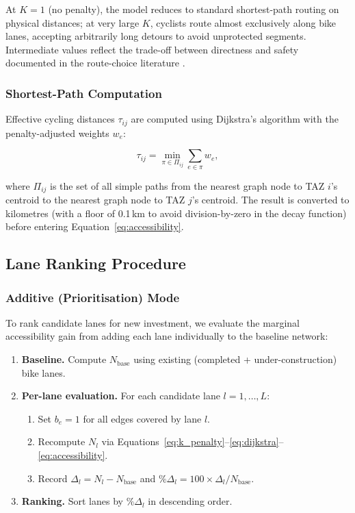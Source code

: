 \documentclass[12pt,a4paper]{article}
\begin{document}


At $K = 1$ (no penalty), the model reduces to standard shortest-path routing on physical distances; at very large $K$, cyclists route almost exclusively along bike lanes, accepting arbitrarily long detours to avoid unprotected segments. Intermediate values reflect the trade-off between directness and safety documented in the route-choice literature \citep{broach2012bicycle,winters2010far}.

\subsubsection{Shortest-Path Computation}

Effective cycling distances $\tau_{ij}$ are computed using Dijkstra's algorithm with the penalty-adjusted weights $w_e$:

\begin{equation}
\tau_{ij} = \min_{\pi \in \Pi_{ij}} \sum_{e \in \pi} w_e,
\label{eq:dijkstra}
\end{equation}

\noindent where $\Pi_{ij}$ is the set of all simple paths from the nearest graph node to TAZ $i$'s centroid to the nearest graph node to TAZ $j$'s centroid. The result is converted to kilometres (with a floor of 0.1\,km to avoid division-by-zero in the decay function) before entering Equation~\eqref{eq:accessibility}.

\subsection{Lane Ranking Procedure}
\label{sec:ranking}

\subsubsection{Additive (Prioritisation) Mode}

To rank candidate lanes for new investment, we evaluate the marginal accessibility gain from adding each lane individually to the baseline network:

\begin{enumerate}[leftmargin=*,nosep]
    \item \textbf{Baseline.} Compute $N_{\mathrm{base}}$ using existing (completed + under-construction) bike lanes.
    \item \textbf{Per-lane evaluation.} For each candidate lane $l = 1, \ldots, L$:
    \begin{enumerate}[nosep]
        \item Set $b_e = 1$ for all edges covered by lane $l$.
        \item Recompute $N_l$ via Equations~\eqref{eq:k_penalty}--\eqref{eq:dijkstra}--\eqref{eq:accessibility}.
        \item Record $\Delta_l = N_l - N_{\mathrm{base}}$ and $\%\Delta_l = 100 \times \Delta_l / N_{\mathrm{base}}$.
    \end{enumerate}
    \item \textbf{Ranking.} Sort lanes by $\%\Delta_l$ in descending order.
\end{enumerate}
\end{document}
